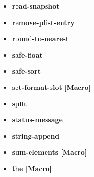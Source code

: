 \documentclass [11pt]{book}
\begin{document}
\begin{itemize}
\item {}
\label{prim:read-snapshot}
\textbf{read-snapshot}





\item {}
\label{prim:remove-plist-entry}
\textbf{remove-plist-entry}





\item {}
\label{prim:round-to-nearest}
\textbf{round-to-nearest}





\item {}
\label{prim:safe-float}
\textbf{safe-float}





\item {}
\label{prim:safe-sort}
\textbf{safe-sort}





\item {}
\label{prim:set-format-slot}
\textbf{set-format-slot [Macro]}





\item {}
\label{prim:split}
\textbf{split}





\item {}
\label{prim:status-message}
\textbf{status-message}





\item {}
\label{prim:string-append}
\textbf{string-append}





\item {}
\label{prim:sum-elements}
\textbf{sum-elements [Macro]}





\item {}
\label{prim:the}
\textbf{the [Macro]}






\end{itemize}
\end{document}
